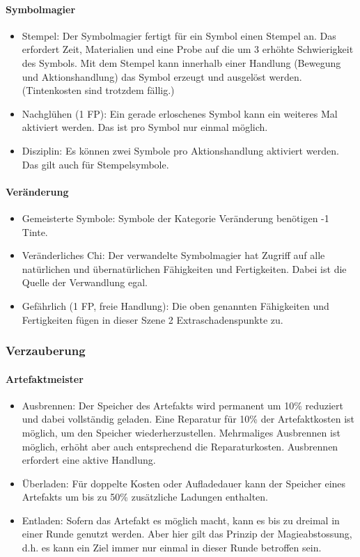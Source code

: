 \documentclass{article}
\begin{document}
\paragraph{Symbolmagier}

\begin{itemize}
\item Stempel: Der Symbolmagier fertigt für ein Symbol einen Stempel an. Das erfordert Zeit, Materialien und eine Probe auf die um 3 erhöhte Schwierigkeit des Symbols. Mit dem Stempel kann innerhalb einer Handlung (Bewegung und Aktionshandlung) das Symbol erzeugt und ausgelöst werden. (Tintenkosten sind trotzdem fällig.)
\item Nachglühen (1 FP): Ein gerade erloschenes Symbol kann ein weiteres Mal aktiviert werden. Das ist pro Symbol nur einmal möglich.
\item Disziplin: Es können zwei Symbole pro Aktionshandlung aktiviert werden. Das gilt auch für Stempelsymbole.
\end{itemize}

\paragraph{Veränderung}

\begin{itemize}
\item Gemeisterte Symbole: Symbole der Kategorie Veränderung benötigen -1 Tinte.
\item Veränderliches Chi: Der verwandelte Symbolmagier hat Zugriff auf alle natürlichen und übernatürlichen Fähigkeiten und Fertigkeiten. Dabei ist die Quelle der Verwandlung egal.
\item Gefährlich (1 FP, freie Handlung): Die oben genannten Fähigkeiten und Fertigkeiten fügen in dieser Szene 2 Extraschadenspunkte zu.
\end{itemize}

\subsubsection{Verzauberung}

\paragraph{Artefaktmeister}

\begin{itemize}
\item Ausbrennen: Der Speicher des Artefakts wird permanent um 10\% reduziert und dabei vollständig geladen. Eine Reparatur für 10\% der Artefaktkosten ist möglich, um den Speicher wiederherzustellen. Mehrmaliges Ausbrennen ist möglich, erhöht aber auch entsprechend die Reparaturkosten. Ausbrennen erfordert eine aktive Handlung.
\item Überladen: Für doppelte Kosten oder Aufladedauer kann der Speicher eines Artefakts um bis zu 50\% zusätzliche Ladungen enthalten.
\item Entladen: Sofern das Artefakt es möglich macht, kann es bis zu dreimal in einer Runde genutzt werden. Aber hier gilt das Prinzip der Magieabstossung, d.h. es kann ein Ziel immer nur einmal in dieser Runde betroffen sein.
\end{itemize}
\end{document}
